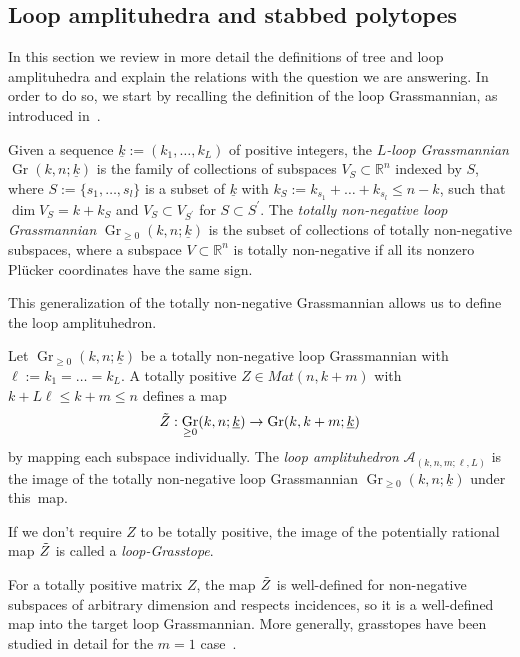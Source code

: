 \documentclass[english]{ourlematema}
\DeclareMathOperator{\Gr}{Gr}
\begin{document}
\subsection{Loop amplituhedra and stabbed polytopes}\label{sec : loop amplituhedra}

In this section we review in more detail the definitions of tree and loop amplituhedra and explain the relations with the question we are answering. In order to do so, we start by recalling the definition of the loop Grassmannian, as introduced in~\cite{PositiveGeometryandCanonicalForms}.

\begin{dfn}
    Given a sequence $\underline{k}:=(k_1,\dots,k_L)$ of positive integers, the \emph{$L$-loop Grassmannian} $\Gr(k,n;\underline{k})$ is the family of collections of subspaces $V_S \subset \mathbb{R}^n$ indexed by $S$, where $S:=\{s_1,\dots, s_l\}$ is a subset of $\underline{k}$ with $k_S:=k_{s_1}+\dots +k_{s_l}\leq n-k$, such that $\dim V_S=k+k_S$ and $V_S \subset V_{S^{\prime}}$ for $S \subset S^{\prime}$.
    The {\em totally non-negative loop Grassmannian} $\Gr_{\geq 0}(k,n;\underline{k})$ is the subset of collections of totally non-negative subspaces, where a subspace $V \subset \mathbb{R}^n$ is totally non-negative if all its nonzero Pl\"ucker coordinates have the same sign. 
\end{dfn}

This generalization of the totally non-negative Grassmannian allows us to define the loop amplituhedron.

\begin{dfn}
   Let $ \Gr_{\geq 0}(k,n;\underline{k})$ be a totally non-negative loop Grassmannian with $\ell:=k_1=\dots =k_L$. A totally positive $Z \in Mat(n,k+m)$ with $k+L\ell \leq k+m \leq n$ defines a map 
   $$\Tilde{Z}:\Gr_{\geq 0}(k,n;\underline{k}) \to \Gr(k,k+m;\underline{k})$$
   by mapping each subspace individually.
   The {\em loop amplituhedron} $\mathcal{A}_{(k,n,m;\ell,L)}$ is the image of the totally non-negative loop Grassmannian $\Gr_{\geq 0}(k,n;\underline{k})$ under this~map. 

   If we don't require $Z$ to be totally positive, the image of the potentially rational map $\Tilde{Z}$ is called a \emph{loop-Grasstope}.
\end{dfn}

\begin{rem}
    For a totally positive matrix $Z$, the map $\Tilde{Z}$ is well-defined for non-negative subspaces of arbitrary dimension \cite{LamGrasstopes} and respects incidences, so it is a well-defined map into the target loop Grassmannian. More generally, grasstopes have been studied in detail for the $m=1$ case~\cite{grasstopes}.
\end{rem}
\end{document}
